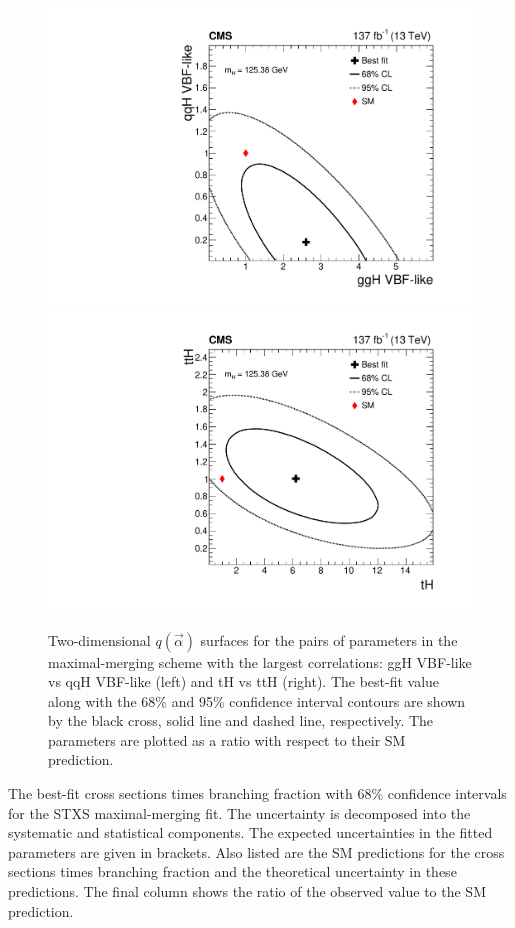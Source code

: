 \begin{figure}
  \centering
  \includegraphics[width=.4\textwidth]{Figures/hgg_results/scan2D_r_ggH_VBFlike_vs_r_qqH_VBFlike_obs.pdf}
  \includegraphics[width=.4\textwidth]{Figures/hgg_results/scan2D_r_tH_vs_r_ttH_obs.pdf}
  \caption[Two-dimensional likelihood scans for highly-correlated parameters in the maximal-merging scheme]
  {
    Two-dimensional $q(\vec{\alpha})$ surfaces for the pairs of parameters in the maximal-merging scheme with the largest correlations: ggH VBF-like vs qqH VBF-like (left) and tH vs ttH (right). The best-fit value along with the 68\% and 95\% confidence interval contours are shown by the black cross, solid line and dashed line, respectively. The parameters are plotted as a ratio with respect to their SM prediction.
  }
  \label{fig:2d_maximal}
\end{figure}

\begin{table}
  \centering
  \scriptsize
  \renewcommand{\arraystretch}{2}
  \setlength{\tabcolsep}{2.2pt}
  \caption[Results of the maximal-merging fit]
  {
    The best-fit cross sections times branching fraction with 68\% confidence intervals for the STXS maximal-merging fit. The uncertainty is decomposed into the systematic and statistical components. The expected uncertainties in the fitted parameters are given in brackets. Also listed are the SM predictions for the cross sections times branching fraction and the theoretical uncertainty in these predictions. The final column shows the ratio of the observed value to the SM prediction.
  }
  \label{tab:stage1p2_maximal_results}
  \hspace*{-1cm}
  
  \hspace*{-1cm}
\end{table}

